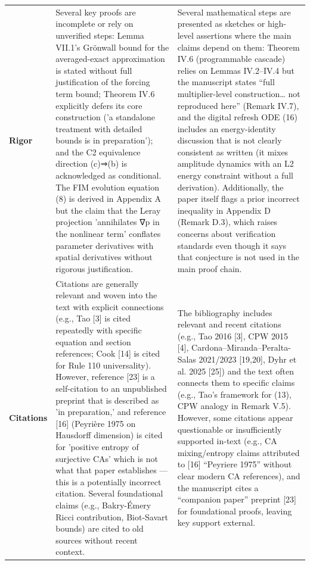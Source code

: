 \documentclass[11pt]{article}
\begin{document}
\begin{longtable}{@{} p{2.2cm} p{6.3cm} p{6.3cm} @{}}
\rowcolor{rowgray}
\textbf{Rigor} &
Several key proofs are incomplete or rely on unverified steps: Lemma VII.1's Grönwall bound for the averaged-exact approximation is stated without full justification of the forcing term bound; Theorem IV.6 explicitly defers its core construction ('a standalone treatment with detailed bounds is in preparation'); and the C2 equivalence direction (c)⇒(b) is acknowledged as conditional. The FIM evolution equation (8) is derived in Appendix A but the claim that the Leray projection 'annihilates ∇p in the nonlinear term' conflates parameter derivatives with spatial derivatives without rigorous justification. &
Several mathematical steps are presented as sketches or high-level assertions where the main claims depend on them: Theorem IV.6 (programmable cascade) relies on Lemmas IV.2–IV.4 but the manuscript states “full multiplier-level construction… not reproduced here” (Remark IV.7), and the digital refresh ODE (16) includes an energy-identity discussion that is not clearly consistent as written (it mixes amplitude dynamics with an L2 energy constraint without a full derivation). Additionally, the paper itself flags a prior incorrect inequality in Appendix D (Remark D.3), which raises concerns about verification standards even though it says that conjecture is not used in the main proof chain. \\[6pt]

\textbf{Citations} &
Citations are generally relevant and woven into the text with explicit connections (e.g., Tao [3] is cited repeatedly with specific equation and section references; Cook [14] is cited for Rule 110 universality). However, reference [23] is a self-citation to an unpublished preprint that is described as 'in preparation,' and reference [16] (Peyrière 1975 on Hausdorff dimension) is cited for 'positive entropy of surjective CAs' which is not what that paper establishes — this is a potentially incorrect citation. Several foundational claims (e.g., Bakry-Émery Ricci contribution, Biot-Savart bounds) are cited to old sources without recent context. &
The bibliography includes relevant and recent citations (e.g., Tao 2016 [3], CPW 2015 [4], Cardona–Miranda–Peralta-Salas 2021/2023 [19,20], Dyhr et al. 2025 [25]) and the text often connects them to specific claims (e.g., Tao’s framework for (13), CPW analogy in Remark V.5). However, some citations appear questionable or insufficiently supported in-text (e.g., CA mixing/entropy claims attributed to [16] “Peyriere 1975” without clear modern CA references), and the manuscript cites a “companion paper” preprint [23] for foundational proofs, leaving key support external. \\

\end{longtable}
\end{document}
